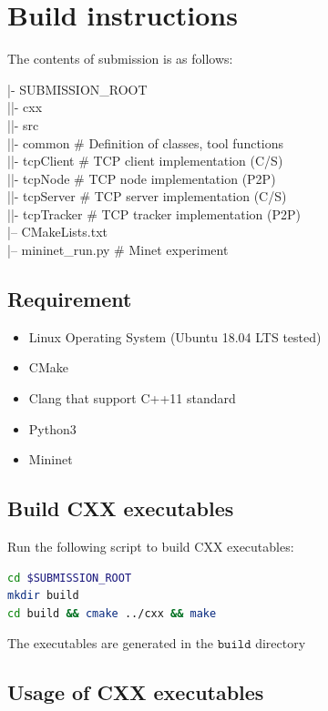  \section{Build instructions}
    The contents of submission is as follows:
    
    |- SUBMISSION\_ROOT \\
    |\quad|- cxx \\
    |\quad\quad |- src \\
    |\quad\quad\quad |- common \# Definition of classes, tool functions\\ 
    |\quad\quad\quad |- tcpClient \# TCP client implementation (C/S)\\
    |\quad\quad\quad |- tcpNode \# TCP node implementation (P2P)\\
    |\quad\quad\quad |- tcpServer \# TCP server implementation (C/S)\\
    |\quad\quad\quad |- tcpTracker \# TCP tracker implementation (P2P) \\
    |\quad\quad -- CMakeLists.txt \\
    |\quad-- mininet\_run.py \# Minet experiment\\

\subsection{Requirement}
\begin {itemize}
\item Linux Operating System (Ubuntu 18.04 LTS tested)
\item CMake
\item Clang that support C++11 standard
\item Python3
\item Mininet
\end {itemize}

\subsection{Build CXX executables}
Run the following script to build CXX executables:
\begin{lstlisting}[language=bash]
cd $SUBMISSION_ROOT
mkdir build
cd build && cmake ../cxx && make
\end{lstlisting}
The executables are generated in the $\mathtt{build}$ directory

\subsection{Usage of CXX executables}
